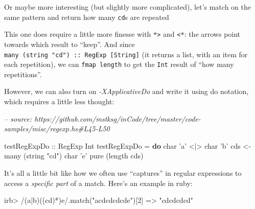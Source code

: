 \documentclass[]{article}
\newenvironment{Shaded}{}{}
\newcommand{\CharTok}[1]{\textcolor[rgb]{0.25,0.44,0.63}{#1}}
\newcommand{\CommentTok}[1]{\textcolor[rgb]{0.38,0.63,0.69}{\textit{#1}}}
\newcommand{\DataTypeTok}[1]{\textcolor[rgb]{0.56,0.13,0.00}{#1}}
\newcommand{\DecValTok}[1]{\textcolor[rgb]{0.25,0.63,0.44}{#1}}
\newcommand{\FunctionTok}[1]{\textcolor[rgb]{0.02,0.16,0.49}{#1}}
\newcommand{\KeywordTok}[1]{\textcolor[rgb]{0.00,0.44,0.13}{\textbf{#1}}}
\newcommand{\NormalTok}[1]{#1}
\newcommand{\OtherTok}[1]{\textcolor[rgb]{0.00,0.44,0.13}{#1}}
\newcommand{\StringTok}[1]{\textcolor[rgb]{0.25,0.44,0.63}{#1}}
\begin{document}
Or maybe more interesting (but slightly more complicated), let's match on the
same pattern and return how many \texttt{cd}s are repeated

\begin{Shaded}
\end{Shaded}

This one does require a little more finesse with \texttt{*\textgreater{}} and
\texttt{\textless{}*}: the arrows point towards which result to ``keep''. And
since \texttt{many\ (string\ "cd")\ ::\ RegExp\ {[}String{]}} (it returns a
list, with an item for each repetition), we can \texttt{fmap\ length} to get the
\texttt{Int} result of ``how many repetitions''.

However, we can also turn on \emph{-XApplicativeDo} and write it using do
notation, which requires a little less thought:

\begin{Shaded}
\begin{Highlighting}[]
\CommentTok{-- source: https://github.com/mstksg/inCode/tree/master/code-samples/misc/regexp.hs#L45-L50}

\OtherTok{testRegExpDo ::} \DataTypeTok{RegExp} \DataTypeTok{Int}
\NormalTok{testRegExpDo }\FunctionTok{=} \KeywordTok{do}
\NormalTok{    char }\CharTok{'a'} \FunctionTok{<|>}\NormalTok{ char }\CharTok{'b'}
\NormalTok{    cds }\OtherTok{<-}\NormalTok{ many (string }\StringTok{"cd"}\NormalTok{)}
\NormalTok{    char }\CharTok{'e'}
    \FunctionTok{pure}\NormalTok{ (}\FunctionTok{length}\NormalTok{ cds)}
\end{Highlighting}
\end{Shaded}

It's all a little bit like how we often use ``captures'' in regular expressions
to access a \emph{specific part} of a match. Here's an example in ruby:

\begin{Shaded}
\begin{Highlighting}[]
\NormalTok{irb> }\OtherTok{/(a|b)((cd)*)e/}\NormalTok{.match(}\StringTok{"acdcdcdcde"}\NormalTok{)[}\DecValTok{2}\NormalTok{]}
\NormalTok{=> }\StringTok{"cdcdcdcd"}
\end{Highlighting}
\end{Shaded}
\end{document}
